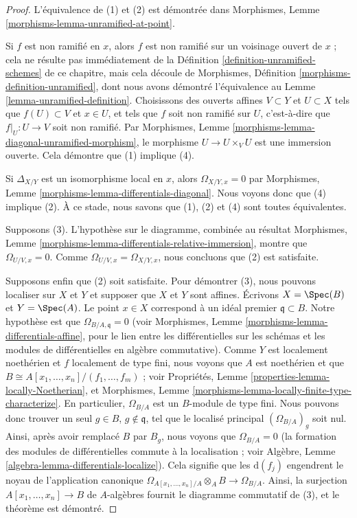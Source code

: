 \begin{proof}
L'équivalence de (1) et (2) est démontrée dans
Morphismes, Lemme \ref{morphisms-lemma-unramified-at-point}.

\medskip\noindent
Si $f$ est non ramifié en $x$, alors $f$ est non ramifié sur un voisinage
ouvert de $x$ ; cela ne résulte pas immédiatement
de la Définition \ref{definition-unramified-schemes} de ce chapitre,
mais cela découle de
Morphismes, Définition \ref{morphisms-definition-unramified}, dont nous
avons démontré l'équivalence au
Lemme \ref{lemma-unramified-definition}.
Choisissons des ouverts affines $V \subset Y$ et $U \subset X$
tels que $f(U) \subset V$ et $x \in U$, et tels que $f$ soit
non ramifié sur $U$, c'est-à-dire que $f|_U : U \to V$ soit non ramifié.
Par Morphismes, Lemme \ref{morphisms-lemma-diagonal-unramified-morphism},
le morphisme $U \to U \times_V U$
est une immersion ouverte. Cela démontre que (1) implique (4).

\medskip\noindent
Si $\Delta_{X/Y}$ est un isomorphisme local en $x$, alors
$\Omega_{X/Y, x} = 0$ par
Morphismes, Lemme \ref{morphisms-lemma-differentials-diagonal}.
Nous voyons donc que (4) implique (2).
À ce stade, nous savons que (1), (2) et (4) sont toutes équivalentes.

\medskip\noindent
Supposons (3). L'hypothèse sur le diagramme, combinée au résultat
Morphismes, Lemme \ref{morphisms-lemma-differentials-relative-immersion},
montre que $\Omega_{U/V, x} = 0$. Comme $\Omega_{U/V, x} = \Omega_{X/Y, x}$,
nous concluons que (2) est satisfaite.

\medskip\noindent
Supposons enfin que (2) soit satisfaite. Pour démontrer (3), nous pouvons localiser sur
$X$ et $Y$ et supposer que $X$ et $Y$ sont affines.
Écrivons $X = \Spec(B)$ et $Y = \Spec(A)$.
Le point $x \in X$ correspond à un idéal premier $\mathfrak q \subset B$.
Notre hypothèse est que $\Omega_{B/A, \mathfrak q} = 0$
(voir Morphismes, Lemme \ref{morphisms-lemma-differentials-affine}, pour le
lien entre les différentielles sur les schémas et les modules
de différentielles en algèbre commutative).
Comme $Y$ est localement noethérien et $f$ localement de type fini,
nous voyons que $A$ est noethérien et que
$B \cong A[x_1, \ldots, x_n]/(f_1, \ldots, f_m)$ ; voir
Propriétés, Lemme \ref{properties-lemma-locally-Noetherian}, et
Morphismes, Lemme \ref{morphisms-lemma-locally-finite-type-characterize}.
En particulier, $\Omega_{B/A}$ est un $B$-module de type fini. Nous
pouvons donc trouver un seul $g \in B$, $g \not \in \mathfrak q$, tel que
le localisé principal $(\Omega_{B/A})_g$ soit nul. Ainsi, après
avoir remplacé $B$ par $B_g$, nous voyons que $\Omega_{B/A} = 0$ (la formation
des modules de différentielles commute à la localisation ; voir
Algèbre, Lemme \ref{algebra-lemma-differentials-localize}). Cela signifie que
les $\text{d}(f_j)$ engendrent le noyau de l'application canonique
$\Omega_{A[x_1, \ldots, x_n]/A} \otimes_A B \to \Omega_{B/A}$.
Ainsi, la surjection $A[x_1, \ldots, x_n] \to B$ de $A$-algèbres fournit le
diagramme commutatif de (3), et le théorème est démontré.
\end{proof}

